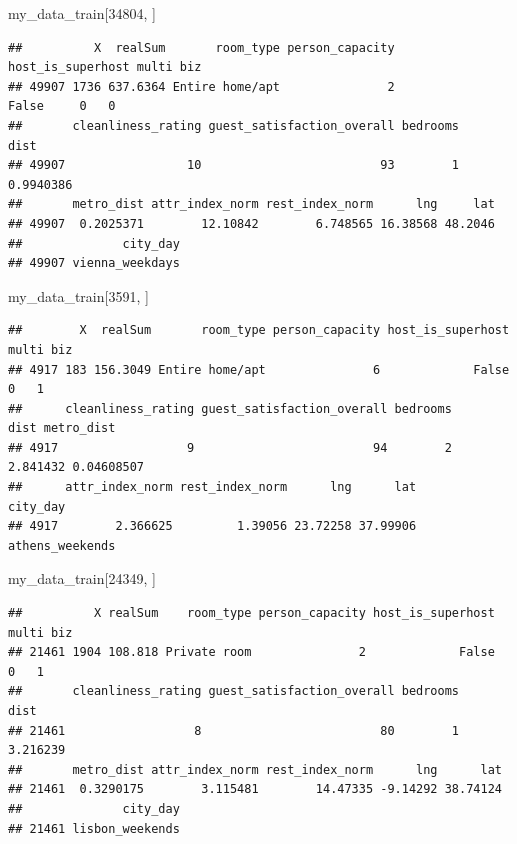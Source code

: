 \documentclass[
]{article}
\newenvironment{Shaded}{\begin{snugshade}}{\end{snugshade}}
\newcommand{\DecValTok}[1]{\textcolor[rgb]{0.00,0.00,0.81}{#1}}
\newcommand{\NormalTok}[1]{#1}
\begin{document}
\begin{Shaded}
\begin{Highlighting}[]
\NormalTok{my\_data\_train[}\DecValTok{34804}\NormalTok{, ]}
\end{Highlighting}
\end{Shaded}

\begin{verbatim}
##          X  realSum       room_type person_capacity host_is_superhost multi biz
## 49907 1736 637.6364 Entire home/apt               2             False     0   0
##       cleanliness_rating guest_satisfaction_overall bedrooms      dist
## 49907                 10                         93        1 0.9940386
##       metro_dist attr_index_norm rest_index_norm      lng     lat
## 49907  0.2025371        12.10842        6.748565 16.38568 48.2046
##              city_day
## 49907 vienna_weekdays
\end{verbatim}

\begin{Shaded}
\begin{Highlighting}[]
\NormalTok{my\_data\_train[}\DecValTok{3591}\NormalTok{, ]}
\end{Highlighting}
\end{Shaded}

\begin{verbatim}
##        X  realSum       room_type person_capacity host_is_superhost multi biz
## 4917 183 156.3049 Entire home/apt               6             False     0   1
##      cleanliness_rating guest_satisfaction_overall bedrooms     dist metro_dist
## 4917                  9                         94        2 2.841432 0.04608507
##      attr_index_norm rest_index_norm      lng      lat        city_day
## 4917        2.366625         1.39056 23.72258 37.99906 athens_weekends
\end{verbatim}

\begin{Shaded}
\begin{Highlighting}[]
\NormalTok{my\_data\_train[}\DecValTok{24349}\NormalTok{, ]}
\end{Highlighting}
\end{Shaded}

\begin{verbatim}
##          X realSum    room_type person_capacity host_is_superhost multi biz
## 21461 1904 108.818 Private room               2             False     0   1
##       cleanliness_rating guest_satisfaction_overall bedrooms     dist
## 21461                  8                         80        1 3.216239
##       metro_dist attr_index_norm rest_index_norm      lng      lat
## 21461  0.3290175        3.115481        14.47335 -9.14292 38.74124
##              city_day
## 21461 lisbon_weekends
\end{verbatim}
\end{document}
